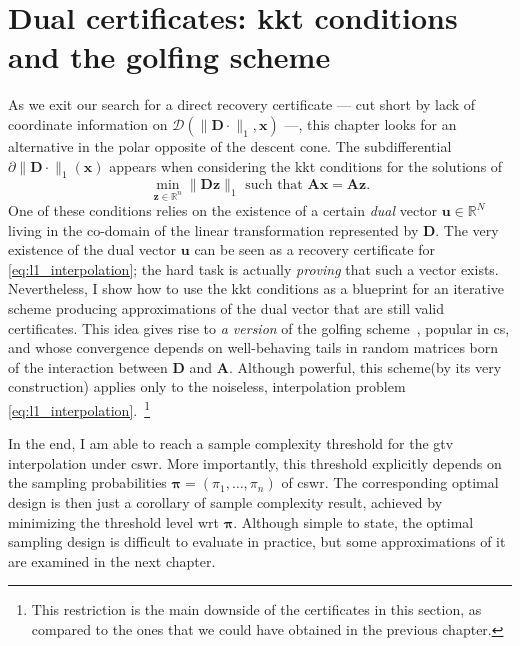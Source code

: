 \chapter{Dual certificates: \texorpdfstring{\acrshort{kkt}}{KKT} conditions and the golfing scheme}\label{ch:inexact_dual}

As we exit our search for a direct recovery certificate --- cut short by lack of coordinate information on $\mathcal{D}( \|\mathbf{D} \cdot \|_1, \mathbf{x})$ ---, this chapter looks for an alternative in the polar opposite of the descent cone. The subdifferential $\partial \|\mathbf{D} \cdot\|_1(\mathbf{x})$ appears when considering the \acrfull{kkt} conditions for the solutions of
\begin{equation}
    \underset{\mathbf{z} \in \mathbb{R}^{n}}{\min} \| \mathbf{D z} \|_1 \text{ such that } \mathbf{Ax = Az} \tag{P1}.
\end{equation}
One of these conditions relies on the existence of a certain \emph{dual} vector $\mathbf{u} \in \mathbb{R}^{N}$ living in the co-domain of the linear transformation represented by $\mathbf{D}$. The very existence of the dual vector $\mathbf{u}$ can be seen as a recovery certificate for \eqref{eq:l1_interpolation}; the hard task is actually \emph{proving} that such a vector exists. Nevertheless, I show how to use the \acrshort{kkt} conditions as a blueprint for an iterative scheme producing approximations of the dual vector that are still valid certificates. This idea gives rise to \emph{a version} of the golfing scheme~\cite{gross2011}, popular in \acrlong{cs}, and whose convergence depends on well-behaving tails in random matrices born of the interaction between $\mathbf{D}$ and $\mathbf{A}$. Although powerful, this scheme(by its very construction) applies only to the noiseless, interpolation problem \eqref{eq:l1_interpolation}.~\footnote{This restriction is the main downside of the certificates in this section, as compared to the ones that we could have obtained in the previous chapter.}

In the end, I am able to reach a sample complexity threshold for the \acrshort{gtv} interpolation under \acrfull{cswr}. More importantly, this threshold explicitly depends on the sampling probabilities $\bm{\pi} = (\pi_1, \dots, \pi_n)$ of \acrshort{cswr}. The corresponding optimal design is then just a corollary of sample complexity result, achieved by minimizing the threshold level \acrlong{wrt} $\bm{\pi}$. Although simple to state, the optimal sampling design is difficult to evaluate in practice, but some approximations of it are examined in the next chapter.


